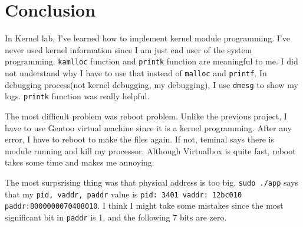 \chapter{Conclusion}
In Kernel lab, I've learned how to implement kernel module programming.
I've never used kernel information since I am just end user of the system programming.
\texttt{kamlloc} function and \texttt{printk} function are meaningful to me.
I did not understand why I have to use that instead of \texttt{malloc} and \texttt{printf}.
In debugging process(not kernel debugging, my debugging), I use \texttt{dmesg} to show my logs.
\texttt{printk} function was really helpful. 

The most difficult problem was reboot problem.
Unlike the previous project, I have to use Gentoo virtual machine since it is a kernel programming.
After any error, I have to reboot to make the files again.
If not, teminal says there is module running and kill my processor.
Although Virtualbox is quite fast, reboot takes some time and makes me annoying.


The most surpsrising thing was that physical address is too big.
\texttt{sudo ./app} says that my \texttt{pid, vaddr, paddr} value is
\texttt{pid: 3401 vaddr: 12bc010 paddr:8000000070488010}.
I think I might take some mistakes since the most significant bit in \texttt{paddr} is 1, and the following 7 bits are zero.

